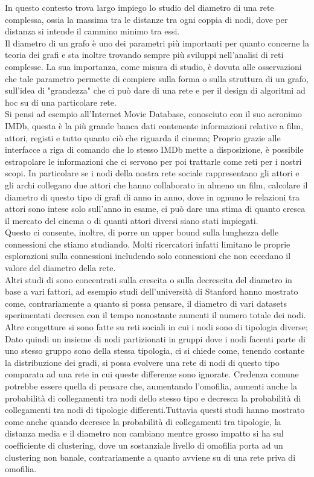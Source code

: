 \documentclass[twoside,openright,titlepage,fleqn,
	headinclude,11pt,a4paper,BCOR5mm,footinclude,pdftex
	]{scrbook}
\begin{document}
In questo contesto trova largo impiego lo studio del diametro di una rete complessa, ossia la massima tra le distanze tra ogni coppia di nodi, dove per distanza si intende il cammino minimo tra essi.\\
Il diametro di un grafo è uno dei parametri più importanti  per quanto concerne la teoria dei grafi e sta inoltre trovando sempre più sviluppi nell'analisi di reti complesse.
La sua importanza, come misura di studio, è dovuta alle osservazioni che tale parametro permette di compiere sulla forma o sulla struttura di un grafo, sull'idea di "grandezza" che ci può dare di una rete e per il design di algoritmi ad hoc su di una particolare rete.\\Si pensi ad esempio all'Internet Movie Database, conosciuto con il suo acronimo IMDb, questa è la più grande banca dati contenente informazioni relative a film, attori, registi e tutto quanto ciò che riguarda il cinema; Proprio grazie alle interfacce a riga di comando che lo stesso IMDb mette a disposizione, è possibile estrapolare le informazioni che ci servono per poi trattarle come reti per i nostri scopi. In particolare se i nodi della nostra rete sociale rappresentano gli attori e gli archi collegano due attori che hanno collaborato in almeno un film, calcolare il diametro di questo tipo di grafi di anno in anno, dove in ognuno le relazioni tra attori sono intese solo sull'anno in esame, ci può dare una stima di quanto cresca il mercato del cinema o di quanti attori diversi siano stati impiegati.\\
Questo ci consente, inoltre, di porre un upper bound sulla lunghezza delle connessioni che stiamo studiando. Molti ricercatori infatti limitano le proprie esplorazioni sulla connessioni includendo solo connessioni che non eccedano il valore del diametro della rete.\\
Altri studi di sono concentrati sulla crescita o sulla decrescita del diametro in base a vari fattori, ad esempio studi dell'università di Stanford hanno mostrato come, contrariamente a quanto si possa pensare, il diametro di vari datasets sperimentati decresca con il tempo nonostante aumenti il numero totale dei nodi.\\Altre congetture si sono fatte su reti sociali in cui i nodi sono di tipologia diverse; Dato quindi un insieme di nodi partizionati in gruppi dove i nodi facenti parte di uno stesso gruppo sono della stessa tipologia, ci si chiede come, tenendo costante la distribuzione dei gradi, si possa evolvere una rete di nodi di questo tipo comparata ad una rete in cui queste differenze sono ignorate. Credenza comune potrebbe essere quella di pensare che, aumentando l'omofilia, aumenti anche la probabilità di collegamenti tra nodi dello stesso tipo e decresca la probabilità di collegamenti tra nodi di tipologie differenti.Tuttavia questi studi hanno mostrato come anche quando decresce la probabilità di collegamenti tra tipologie, la distanza media e il diametro non cambiano mentre grosso impatto si ha sul coefficiente di clustering, dove un sostanziale livello di omofilia porta ad un clustering non banale, contrariamente a quanto avviene su di una rete priva di omofilia.
\end{document}
